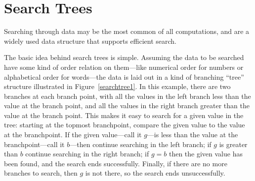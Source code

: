 \newcommand{\brnch}{\text{BBTr}}
\newcommand{\leafp}[1]{\text{leaf?}#1}
\newcommand{\brnchng}{\text{Branching}}
\newcommand{\leafset}{\text{Leaves}}
\newcommand{\rightsub}[1]{\text{right}#1}
\newcommand{\leftsub}[1]{\text{left}#1}
\newcommand{\rslt}[2]{\text{subtree}_{#1}#2}
\newcommand{\subbrn}[1]{\text{Subtrs}(#1)}
\newcommand{\propbrn}[1]{\text{PropSubtrs}(#1)}

\newcommand{\fintr}{\text{FinTr}}

\newcommand{\rectr}{\text{RecTr}}

\newcommand{\trdpth}[1]{\text{recdepth}#1}
\newcommand{\trsize}[1]{\text{recsize}#1}

\newcommand{\nlbl}[1]{\text{num}#1}
\newcommand{\rmin}[1]{\text{recmin}#1}

\newcommand{\trsrch}[1]{\text{srch}#1}



\section{Search Trees}

Searching through data may be the most common of all computations, and
 are a widely used data structure that supports
efficient search.

The basic idea behind search trees is simple.  Assuming the data to be
searched have some kind of order relation on them---like numerical order
for numbers or alphabetical order for words---the data is laid out in
a kind of branching ``tree'' structure illustrated in
Figure~\ref{searchtree1}.  In this example, there are two branches at
each branch point, with all the values in the left branch less than
the value at the branch point, and all the values in the right branch
greater than the value at the branch point.  This makes it easy to
search for a given value in the tree: starting at the topmost
branchpoint, compare the given value to the value at the branchpoint.
If the given value---call it $g$---is less than the value at the
branchpoint---call it $b$---then continue searching in the left
branch; if $g$ is greater than $b$ continue searching in the right
branch; if $g = b$ then the given value has been found, and the search
ends successfully.  Finally, if there are no more branches to search,
then $g$ is not there, so the search ends unsuccessfully.

